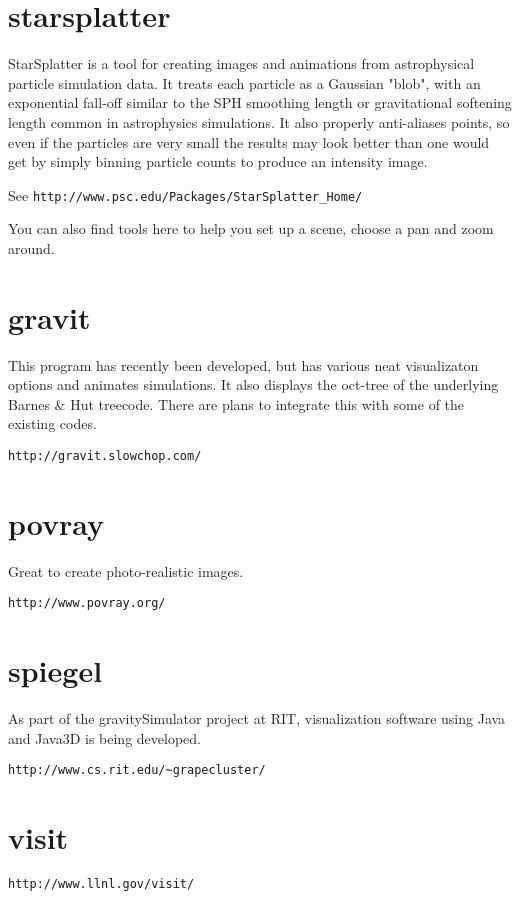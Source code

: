 \section{starsplatter}

StarSplatter is a tool for creating images and animations from
astrophysical particle simulation data. It treats each particle as a
Gaussian "blob", with an exponential fall-off similar to the SPH
smoothing length or gravitational softening length common in
astrophysics simulations. It also properly anti-aliases points, so
even if the particles are very small the results may look better than
one would get by simply binning particle counts to produce an
intensity image.

See {\tt http://www.psc.edu/Packages/StarSplatter\_Home/}

You can also find tools here to help you set up a scene, choose a pan and
zoom around.

\section{gravit}

This program has recently been developed, but has various neat visualizaton
options and animates simulations. It also displays the oct-tree of the
underlying Barnes \& Hut treecode. There are plans to integrate this with
some of the existing codes.

{\tt http://gravit.slowchop.com/}

\section{povray}

Great to create photo-realistic images.

{\tt http://www.povray.org/}

\section{spiegel}

As part of the gravitySimulator project at RIT, visualization software using Java
and Java3D is being developed.

\verb+http://www.cs.rit.edu/~grapecluster/+

\section{visit}

{\tt http://www.llnl.gov/visit/}

